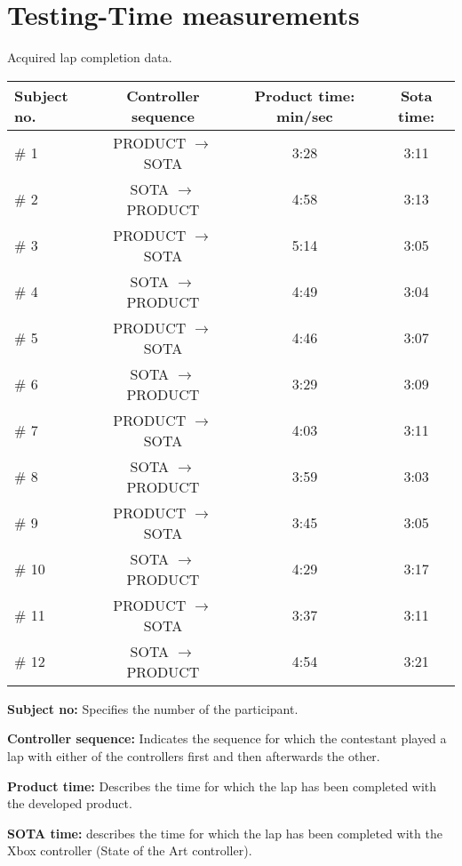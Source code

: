 \section{Testing-Time measurements} \label{app:time}
Acquired lap completion data.

\begin{table}[!htbp]
\centering
\begin{tabular}{| l | c | c | c |}
\hline
\textbf{Subject no.} & \textbf{Controller sequence} & \textbf{Product time: min/sec} & \textbf{Sota time:}\\
\hline
\# 1 & PRODUCT $ \rightarrow $ SOTA & 3:28 & 3:11\\
\# 2 & SOTA $ \rightarrow $ PRODUCT & 4:58 & 3:13\\
\# 3 & PRODUCT $ \rightarrow $ SOTA & 5:14 & 3:05\\
\# 4 & SOTA $ \rightarrow $ PRODUCT & 4:49 & 3:04\\
\# 5 & PRODUCT $ \rightarrow $ SOTA & 4:46 & 3:07\\
\# 6 & SOTA $ \rightarrow $ PRODUCT & 3:29 & 3:09\\
\# 7 & PRODUCT $ \rightarrow $ SOTA & 4:03 & 3:11\\
\# 8 & SOTA $ \rightarrow $ PRODUCT & 3:59 & 3:03\\
\# 9 & PRODUCT $ \rightarrow $ SOTA & 3:45 & 3:05\\
\# 10 & SOTA $ \rightarrow $ PRODUCT & 4:29 & 3:17\\
\# 11 & PRODUCT $ \rightarrow $ SOTA & 3:37 & 3:11\\
\# 12 & SOTA $ \rightarrow $ PRODUCT & 4:54 & 3:21\\
\hline
\end{tabular}
\end{table}

\noindent\textbf{Subject no:} Specifies the number of the participant.


\noindent\textbf{Controller sequence:} Indicates the sequence for which the contestant played a lap with either of the controllers first and then afterwards the other.


\noindent\textbf{Product time:} Describes the time for which the lap has been completed with the developed product.


\noindent\textbf{SOTA time:} describes the time for which the lap has been completed with the Xbox controller (State of the Art controller).